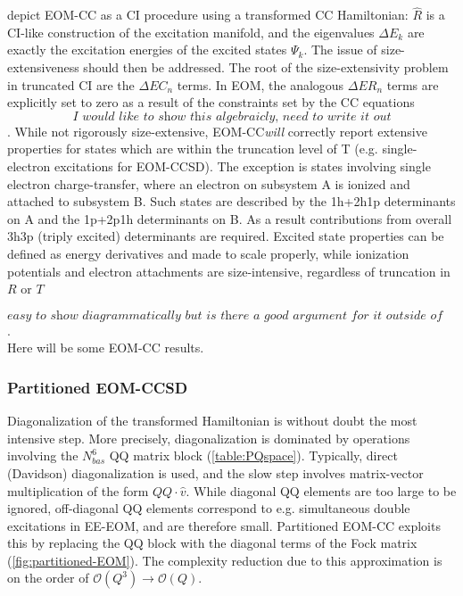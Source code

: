  depict EOM-CC as a CI procedure using a transformed CC Hamiltonian: $\hat{R}$ is a CI-like construction of the excitation manifold, and the eigenvalues $\Delta E_k$ are exactly the excitation energies of the excited states $\Psi_k$. The issue of size-extensiveness should then be addressed. The root of the size-extensivity problem in truncated CI are the $\Delta E C_n$ terms. In EOM, the analogous $\Delta E R_n$ terms are explicitly set to zero as a result of the constraints set by the CC equations
\begin{equation}
\textit{I would like to show this algebraicly, need to write it out}
\end{equation}. While not rigorously size-extensive, EOM-CC\textit{will} correctly report extensive properties for states which are within the truncation level of T (e.g. single-electron excitations for EOM-CCSD). The exception is states involving single electron charge-transfer, where an electron on subsystem A is ionized and attached to subsystem B. Such states are described by the 1h+2h1p determinants on A and the 1p+2p1h determinants on B. As a result contributions from overall 3h3p (triply excited) determinants are required. Excited state properties can be defined as energy derivatives and made to scale properly, while ionization potentials and electron attachments are size-intensive, regardless of truncation in $R$ or $T$ 

\begin{equation}
\textit{easy to show diagrammatically but is there a good argument for it outside of diagrammatic analsys?}
\end{equation}.\\

Here will be some EOM-CC results.


\subsubsection{Partitioned EOM-CCSD}
Diagonalization of the transformed Hamiltonian is without doubt the most intensive step. More precisely, diagonalization is dominated by operations involving the $N_{bas}^6$ QQ matrix block (\cref{table:PQspace}). Typically, direct (Davidson) diagonalization is  used, and the slow step involves matrix-vector multiplication of the form $QQ \cdot \hat{v}$. While diagonal QQ elements are too large to be ignored, off-diagonal QQ elements  correspond to e.g. simultaneous double excitations in EE-EOM, and are therefore small. Partitioned EOM-CC exploits this by replacing the QQ block with the diagonal terms of the Fock matrix (\cref{fig:partitioned-EOM}). The complexity reduction due to this approximation is on the order of $\mathcal{O}(Q^3) \rightarrow \mathcal{O}(Q)$. 

